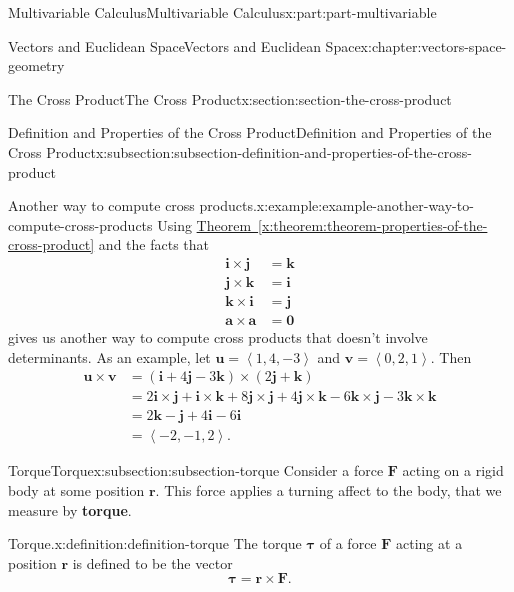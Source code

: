 \documentclass[twoside,10pt,]{book}
\newcommand{\xreffont}{\relax}
\newcommand{\terminology}[1]{\textbf{#1}}
\numberwithin{equation}{part}
\newcommand{\dotprod}[1]{\left\langle #1 \right\rangle}
\begin{document}
\begin{partptx}{Multivariable Calculus}{}{Multivariable Calculus}{}{}{x:part:part-multivariable}
\begin{chapterptx}{Vectors and Euclidean Space}{}{Vectors and Euclidean Space}{}{}{x:chapter:vectors-space-geometry}
\begin{sectionptx}{The Cross Product}{}{The Cross Product}{}{}{x:section:section-the-cross-product}
\begin{subsectionptx}{Definition and Properties of the Cross Product}{}{Definition and Properties of the Cross Product}{}{}{x:subsection:subsection-definition-and-properties-of-the-cross-product}
\begin{example}{Another way to compute cross products.}{x:example:example-another-way-to-compute-cross-products}%
Using \hyperref[x:theorem:theorem-properties-of-the-cross-product]{Theorem~{\xreffont\ref{x:theorem:theorem-properties-of-the-cross-product}}} and the facts that%
%
\begin{align*}
\mathbf{i}\times\mathbf{j} & = \mathbf{k} \\
\mathbf{j}\times\mathbf{k} & = \mathbf{i} \\
\mathbf{k}\times\mathbf{i} & = \mathbf{j} \\
\mathbf{a}\times\mathbf{a} & = \mathbf{0} 
\end{align*}
gives us another way to compute cross products that doesn't involve determinants. As an example, let \(\mathbf{u} = \dotprod{1,4,-3}\) and \(\mathbf{v} = \dotprod{0,2,1}.\) Then%
%
\begin{align*}
\mathbf{u}\times\mathbf{v} & = (\mathbf{i}+4\mathbf{j}-3\mathbf{k})\times(2\mathbf{j}+\mathbf{k}) \\
& = 2\mathbf{i}\times\mathbf{j} + \mathbf{i}\times\mathbf{k} +8\mathbf{j}\times\mathbf{j} + 4\mathbf{j}\times\mathbf{k} - 6\mathbf{k}\times\mathbf{j} -3\mathbf{k}\times\mathbf{k} \\
& = 2\mathbf{k}-\mathbf{j}+4\mathbf{i}-6\mathbf{i} \\
& = \dotprod{-2,-1,2}. 
\end{align*}
\end{example}
\end{subsectionptx}
%
%
\typeout{************************************************}
\typeout{************************************************}
%
\begin{subsectionptx}{Torque}{}{Torque}{}{}{x:subsection:subsection-torque}
Consider a force \(\mathbf{F}\) acting on a rigid body at some position \(\mathbf{r}\). This force applies a turning affect to the body, that we measure by \terminology{torque}.%
\begin{definition}{Torque.}{x:definition:definition-torque}%
%
The torque \(\boldsymbol{\tau}\) of a force \(\mathbf{F}\) acting at a position \(\mathbf{r}\) is defined to be the vector%
%
\begin{equation*}
\boldsymbol{\tau} = \mathbf{r}\times\mathbf{F}.
\end{equation*}
\end{definition}

\end{subsectionptx}
\end{sectionptx}
\end{chapterptx}
\end{partptx}
\end{document}
